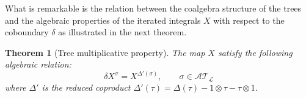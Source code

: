 \documentclass[a4paper,11pt,reqno]{article}
\newcommand{\1}{{\bf 1}}
\newcommand{\der}{\delta}
\newcommand{\cl}{\mathcal L}
\newtheorem{theorem}{Theorem}[section]
\newcommand{\TT}{\mathcal{T}}
\newcommand{\cA}{\mathcal{A}}
\begin{document}
What is remarkable is the relation between the
coalgebra structure of the trees and  the algebraic properties of the
iterated integrals $X$ with respect to the coboundary $\delta$ as illustrated in the next theorem.

\begin{theorem}[Tree multiplicative property]
\label{th:equiv}
The map $X$ satisfy
the following algebraic relation:
\begin{equation}
  \label{eq:alg-relations}
\der X^{\sigma} = X^{\Delta'(\sigma)} , \qquad \sigma \in \cA\TT_\cl
\end{equation}
where $\Delta'$ is the reduced
coproduct
$
\Delta'(\tau) = \Delta(\tau) - 1 \otimes \tau - \tau \otimes 1.
$  
\end{theorem}
\end{document}
